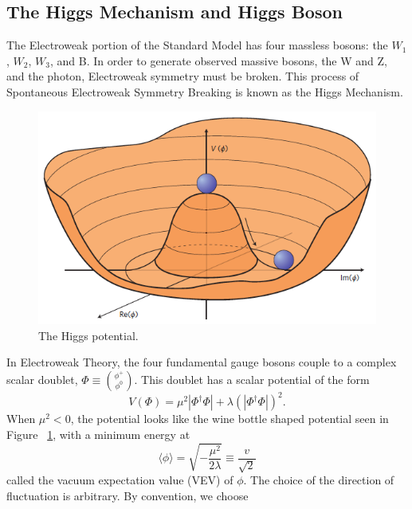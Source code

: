 \subsection{The Higgs Mechanism and Higgs Boson}
\label{ssec:Higgs}
The Electroweak portion of the Standard Model has four massless bosons: the $W_{1}$, $W_{2}$, $W_{3}$, and B. In order to generate observed massive bosons, the W and Z, and the photon, Electroweak symmetry must be broken. This process of Spontaneous Electroweak Symmetry Breaking is known as the Higgs Mechanism.\newline

\begin{figure}[h]
\begin{center}
\includegraphics[scale=0.65]{figures/higgspotential}
\caption[The Higgs potential]{The Higgs potential.\cite{Ellis:1638469}}
\label{Fig:higgspot}
\end{center}
\end{figure}

\indent In Electroweak Theory, the four fundamental gauge bosons couple to a complex scalar doublet, ${\Phi \equiv \binom{\phi^{+}}{\phi^{0}}}$. This doublet has a scalar potential of the form
\begin{equation}
\label{eq:higgsPot}
V(\Phi) = \mu^{2}|\Phi^{\dagger}\Phi| + \lambda(|\Phi^{\dagger}\Phi|)^{2}.
\end{equation}
When ${\mu^{2} < 0}$, the potential looks like the wine bottle shaped potential seen in Figure ~\ref{Fig:higgspot}, with a minimum energy at 
\begin{equation}
\langle \phi \rangle = \sqrt{-\frac{\mu^{2}}{2\lambda}}\equiv \frac{v}{\sqrt{2}}
\end{equation}
called the vacuum expectation value (VEV) of ${\phi}$. The choice of the direction of fluctuation is arbitrary. By convention, we choose


